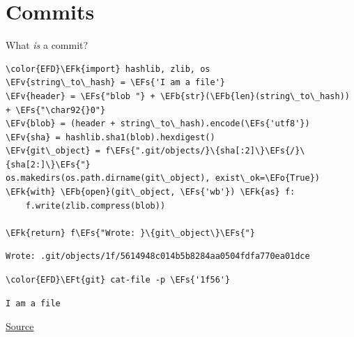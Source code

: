 \documentclass[presentation]{beamer}
\newcommand{\EFs}[1]{\textcolor{EFs}{#1}} %
\newcommand{\EFk}[1]{\textcolor{EFk}{#1}} %
\newcommand{\EFb}[1]{\textcolor{EFb}{#1}} %
\newcommand{\EFv}[1]{\textcolor{EFv}{#1}} %
\newcommand{\EFt}[1]{\textcolor{EFt}{#1}} %
\newcommand{\EFo}[1]{\textcolor{EFo}{#1}} %
\begin{document}
\section{Commits}
\label{sec:orgecde87f}
\begin{frame}[label={sec:orgd59d870},fragile]{What \emph{is} a commit?}
 \tiny

\begin{Code}
\begin{Verbatim}
\color{EFD}\EFk{import} hashlib, zlib, os
\EFv{string\_to\_hash} = \EFs{'I am a file'}
\EFv{header} = \EFs{"blob "} + \EFb{str}(\EFb{len}(string\_to\_hash)) + \EFs{"\char92{}0"}
\EFv{blob} = (header + string\_to\_hash).encode(\EFs{'utf8'})
\EFv{sha} = hashlib.sha1(blob).hexdigest()
\EFv{git\_object} = f\EFs{".git/objects/}\{sha[:2]\}\EFs{/}\{sha[2:]\}\EFs{"}
os.makedirs(os.path.dirname(git\_object), exist\_ok=\EFo{True})
\EFk{with} \EFb{open}(git\_object, \EFs{'wb'}) \EFk{as} f:
    f.write(zlib.compress(blob))

\EFk{return} f\EFs{"Wrote: }\{git\_object\}\EFs{"}
\end{Verbatim}
\end{Code}

\begin{verbatim}
Wrote: .git/objects/1f/5614948c014b5b8284aa0504fdfa770ea01dce
\end{verbatim}


\begin{Code}
\begin{Verbatim}
\color{EFD}\EFt{git} cat-file -p \EFs{'1f56'}
\end{Verbatim}
\end{Code}

\begin{verbatim}
I am a file
\end{verbatim}


\href{https://www.youtube.com/watch?v=0g9BcZvQbXU}{Source}

\end{frame}
\end{document}
